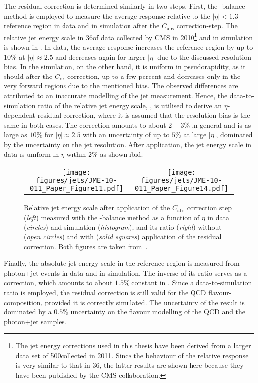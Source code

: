 The residual correction is determined similarly in two steps.
First, the \pt-balance method is employed to measure the average response relative to the \mbox{$|\eta| < 1.3$} reference region in data and in simulation after the $C_{\text{abs}}$ correction-step.
The relative jet energy scale in 36\pbinv of data collected by CMS in 2010\footnote{The jet energy corrections used in this thesis have been derived from a larger data set of 500\pbinv collected in 2011. Since the behaviour of the relative response is very similar to that in 36\pbinv, the latter results are shown here because they have been published by the CMS collaboration.} and in simulation is shown in .
In data, the average response increases \wrt the reference region by up to $10\%$ at \mbox{$|\eta| \approx 2.5$} and decreases again for larger $|\eta|$ due to the discussed resolution bias.
In the simulation, on the other hand, it is uniform in pseudorapidity, as it should after the $C_{\text{rel}}$ correction, up to a few percent and decreases only in the very forward regions due to the mentioned bias.
The observed differences are attributed to an inaccurate modelling of the jet measurement.
Hence, the data-to-simulation ratio of the relative jet energy scale, , is utilised to derive an $\eta$-dependent residual correction, where it is assumed that the resolution bias is the same in both cases.
The correction amounts to about $2-3\%$ in general and is as large as $10\%$ for \mbox{$|\eta| \approx 2.5$} with an uncertainty of up to $5\%$ at large $|\eta|$, dominated by the uncertainty on the jet resolution.
After application, the jet energy scale in data is uniform in $\eta$ within $2\%$ as shown ibid.
\begin{figure}[!ht]
  \centering
  \begin{tabular}{cc}
    \texttt{[image: figures/jets/JME-10-011\_Paper\_Figure11.pdf]} &
    \texttt{[image: figures/jets/JME-10-011\_Paper\_Figure14.pdf]} \\
  \end{tabular}
  \caption{Relative jet energy scale after application of the $C_{\text{abs}}$ correction step (\textit{left}) measured with the \pt-balance method as a function of $\eta$ in data (\textit{circles}) and simulation (\textit{histogram}), and its ratio (\textit{right}) without (\textit{open circles}) and with (\textit{solid squares}) application of the residual correction.
    Both figures are taken from~\cite{1748-0221-6-11-P11002}.}
  \label{fig:Jets:JEC:RelativeResponse}
\end{figure}  
Finally, the absolute jet energy scale in the reference region is measured from photon+jet events in data and in simulation.
The inverse of its ratio serves as a correction, which amounts to about $1.5\%$ constant in \pt.
Since a data-to-simulation ratio is employed, the residual correction is still valid for the QCD flavour-composition, provided it is correctly simulated.
The uncertainty of the result is dominated by a $0.5\%$ uncertainty on the flavour modelling of the QCD and the photon+jet samples.

